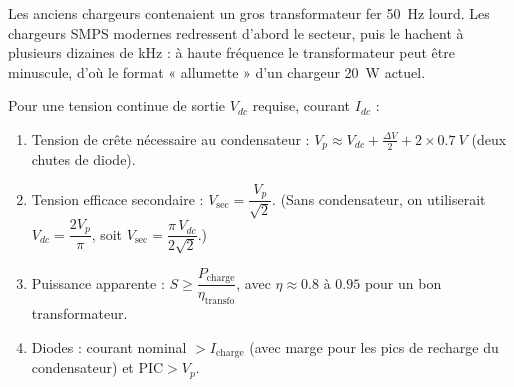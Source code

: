 \documentclass[11pt]{article}
\begin{document}
\begin{savaistu}
Les anciens chargeurs contenaient un gros transformateur fer \SI{50}{Hz} lourd. Les chargeurs SMPS modernes redressent d'abord le secteur, puis le hachent à plusieurs dizaines de kHz : à haute fréquence le transformateur peut être minuscule, d'où le format « allumette » d'un chargeur \SI{20}{W} actuel.
\end{savaistu}

\begin{methode}
Pour une tension continue de sortie $V_{dc}$ requise, courant $I_{dc}$ :
\begin{enumerate}
\item Tension de crête nécessaire au condensateur : $V_p \approx V_{dc} + \frac{\Delta V}{2} + 2\times\SI{0.7}{V}$ (deux chutes de diode).
\item Tension efficace secondaire : $V_{\text{sec}} = \dfrac{V_p}{\sqrt{2}}$. (Sans condensateur, on utiliserait $V_{dc} = \dfrac{2V_p}{\pi}$, soit $V_{\text{sec}} = \dfrac{\pi\,V_{dc}}{2\sqrt{2}}$.)
\item Puissance apparente : $S \geq \dfrac{P_{\text{charge}}}{\eta_{\text{transfo}}}$, avec $\eta \approx 0.8$ à $0.95$ pour un bon transformateur.
\item Diodes : courant nominal $> I_{\text{charge}}$ (avec marge pour les pics de recharge du condensateur) et $\mathrm{PIC} > V_p$.
\end{enumerate}
\end{methode}
\end{document}
